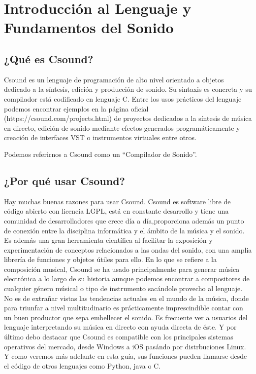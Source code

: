 
\chapter{Introducción al Lenguaje y Fundamentos del Sonido}\label{cap1}
\section{¿Qué es Csound?}\label{sec:intro}

Csound es un lenguaje de programación de alto nivel orientado a objetos dedicado a la síntesis, edición y producción de sonido. Su sintaxis es concreta y su compilador está codificado en lenguaje C. Entre los usos prácticos del lenguaje podemos encontrar ejemplos en la página oficial (https://csound.com/projects.html) de proyectos dedicados a la síntesis de música en directo, edición de sonido mediante efectos generados programáticamente y creación de interfaces VST o instrumentos virtuales entre otros.

Podemos referirnos a Csound como un ``Compilador de Sonido''.

\section{¿Por qué usar Csound?}\label{sec:intro}

Hay muchas buenas razones para usar Csound. Csound es software libre de código abierto con licencia LGPL, está en constante desarrollo y tiene una comunidad de desarrolladores que crece día a día,proporciona además un punto de conexión entre la disciplina informática y el ámbito de la música y el sonido. 
Es además una gran herramienta científica al facilitar la exposición y experimentación de conceptos relacionados a las ondas del sonido, con una amplia librería de funciones y objetos útiles para ello. 
En lo que se refiere a la composición musical, Csound se ha usado principalmente para generar música electrónica a lo largo de su historia aunque podemos encontrar a compositores de cualquier género músical o tipo de instrumento sacándole provecho al lenguaje. No es de extrañar vistas las tendencias actuales en el mundo de la música, donde para triunfar a nivel multitudinario es prácticamente imprescindible contar con un buen productor que sepa embellecer el sonido.
Es frecuente ver a usuarios del lenguaje interpretando su música en directo con ayuda directa de éste.
Y por último debo destacar que Csound es compatible con los principales sistemas operativos del mercado, desde Windows a iOS pasándo por distrbuciones Linux. Y como veremos más adelante en esta guía, sus funciones pueden llamarse desde el código de otros lenguajes como Python, java o C.
\pagebreak

